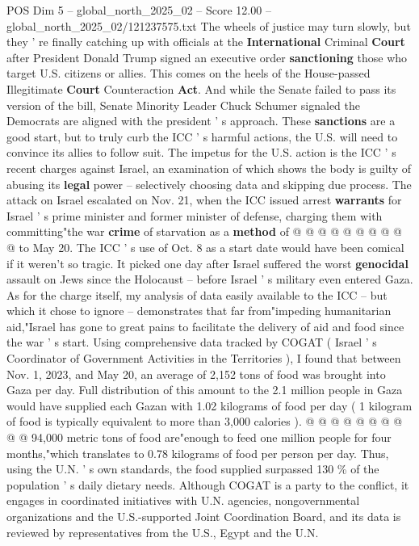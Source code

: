 \begin{textsample}{POS Dim 5 – global\_north\_2025\_02 – Score 12.00 – global\_north\_2025\_02/121237575.txt}  \label{ex:f5_pos_336}
The wheels of justice may turn slowly, but they ' re finally catching up with officials at the \textbf{International} Criminal \textbf{Court} after President Donald Trump signed an executive order \textbf{sanctioning} those who target U.S. citizens or allies.
This comes on the heels of the House-passed Illegitimate \textbf{Court} Counteraction \textbf{Act}.
And while the Senate failed to pass its version of the bill, Senate Minority Leader Chuck Schumer signaled the Democrats are aligned with the president ' s approach.
These \textbf{sanctions} are a good start, but to truly curb the ICC ' s harmful actions, the U.S. will need to convince its allies to follow suit.
The impetus for the U.S. action is the ICC ' s recent charges against Israel, an examination of which shows the body is guilty of abusing its \textbf{legal} power -- selectively choosing data and skipping due process.
The attack on Israel escalated on Nov. 21, when the ICC issued arrest \textbf{warrants} for Israel ' s prime minister and former minister of defense, charging them with committing"the war \textbf{crime} of starvation as a \textbf{method} of @ @ @ @ @ @ @ @ @ @ to May 20.
The ICC ' s use of Oct. 8 as a start date would have been comical if it weren't so tragic.
It picked one day after Israel suffered the worst \textbf{genocidal} assault on Jews since the Holocaust -- before Israel ' s military even entered Gaza.
As for the charge itself, my analysis of data easily available to the ICC -- but which it chose to ignore -- demonstrates that far from"impeding humanitarian aid,"Israel has gone to great pains to facilitate the delivery of aid and food since the war ' s start.
Using comprehensive data tracked by COGAT ( Israel ' s Coordinator of Government Activities in the Territories ), I found that between Nov. 1, 2023, and May 20, an average of 2,152 tons of food was brought into Gaza per day.
Full distribution of this amount to the 2.1 million people in Gaza would have supplied each Gazan with 1.02 kilograms of food per day ( 1 kilogram of food is typically equivalent to more than 3,000 calories ). @ @ @ @ @ @ @ @ @ @ 94,000 metric tons of food are"enough to feed one million people for four months,"which translates to 0.78 kilograms of food per person per day.
Thus, using the U.N. ' s own standards, the food supplied surpassed 130 \% of the population ' s daily dietary needs.
Although COGAT is a party to the conflict, it engages in coordinated initiatives with U.N. agencies, nongovernmental organizations and the U.S.-supported Joint Coordination Board, and its data is reviewed by representatives from the U.S., Egypt and the U.N.

\end{textsample}
